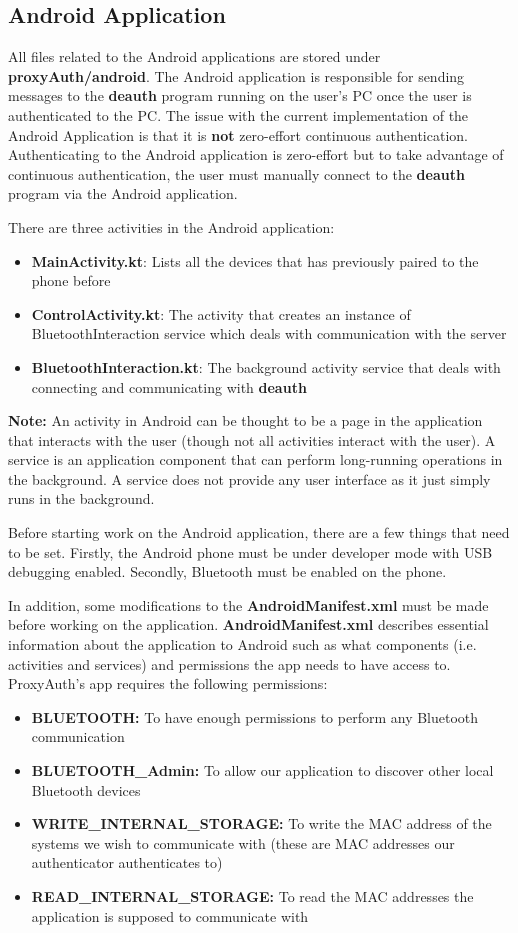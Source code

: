 \documentclass[letterpaper,twocolumn,10pt]{article}
\begin{document}
{{\subsection{Android Application}
All files related to the Android applications are stored under \textbf{proxyAuth/android}. The Android application is responsible for sending messages to the \textbf{deauth} program running on the user's PC once the user is authenticated to the PC. The issue with the current implementation of the Android Application is that it is \textbf{not} zero-effort continuous authentication. Authenticating to the Android application is zero-effort but to take advantage of continuous authentication, the user must manually connect to the \textbf{deauth} program via the Android application.

There are three activities in the Android application:
\begin{itemize}
\item \textbf{MainActivity.kt}: Lists all the devices that has previously paired to the phone before
\item \textbf{ControlActivity.kt}: The activity that creates an instance of BluetoothInteraction service which deals with communication with the server
\item \textbf{BluetoothInteraction.kt}: The background activity service that deals with connecting and communicating with \textbf{deauth}
\end{itemize}

\textbf{Note:} An activity in Android can be thought to be a page in the application that interacts with the user (though not all activities interact with the user). A service is an application component that can perform long-running operations in the background. A service does not provide any user interface as it just simply runs in the background.

Before starting work on the Android application, there are a few things that need to be set. Firstly, the Android phone must be under developer mode with USB debugging enabled. Secondly, Bluetooth must be enabled on the phone.

In addition, some modifications to the \textbf{AndroidManifest.xml} must be made before working on the application. \textbf{AndroidManifest.xml} describes essential information about the application to Android such as what components (i.e. activities and services) and permissions the app needs to have access to. ProxyAuth's app requires the following permissions:
\begin{itemize}
\item \textbf{BLUETOOTH:} To have enough permissions to perform any Bluetooth communication
\item \textbf{BLUETOOTH\_Admin:} To allow our application to discover other local Bluetooth devices
\item \textbf{WRITE\_INTERNAL\_STORAGE:} To write the MAC address of the systems we wish to communicate with (these are MAC addresses our authenticator authenticates to)
\item \textbf{READ\_INTERNAL\_STORAGE:} To read the MAC addresses the application is supposed to communicate with
\end{itemize}

}}
\end{document}
